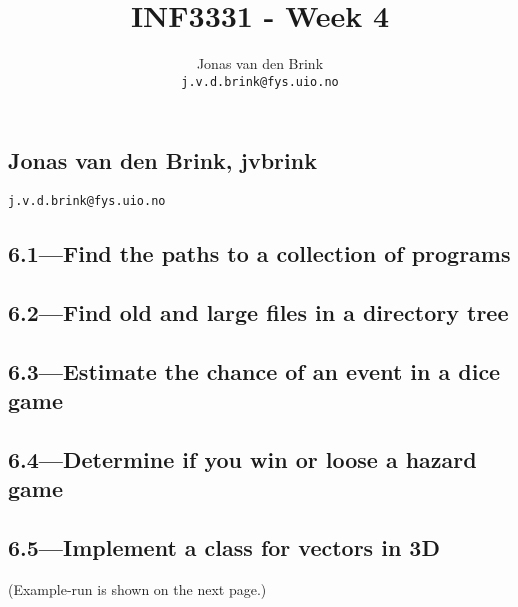 \documentclass[a4paper, 11pt, titlepage, english]{article}
\title{INF3331 - Week 4}
\author{Jonas van den Brink \\ \texttt{j.v.d.brink@fys.uio.no}}
\begin{document}
\pagestyle{empty}
\subsection*{Jonas van den Brink, jvbrink}
\texttt{j.v.d.brink@fys.uio.no}
\subsection*{6.1---Find the paths to a collection of programs}

\clearpage
\subsection*{6.2---Find old and large files in a directory tree}

\clearpage
\subsection*{6.3---Estimate the chance of an event in a dice game}

\clearpage
\subsection*{6.4---Determine if you win or loose a hazard game}

\clearpage
\subsection*{6.5---Implement a class for vectors in 3D}

(Example-run is shown on the next page.)

\clearpage

\end{document}
